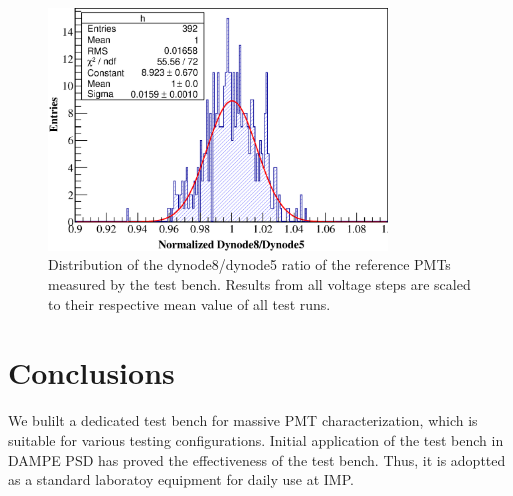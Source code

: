 \documentclass[5p, times]{elsarticle}
\begin{document}
\begin{figure}[h!]
 \centering
 \includegraphics[width=90mm]{RefDy58Dist}
\caption{Distribution of the dynode8/dynode5 ratio of the reference PMTs measured by the test bench.
Results from all voltage steps are scaled to their respective mean value of all test runs.}
\label{fig:dy58_stabiltiy}
\end{figure} 

\section{Conclusions}
\label{sec:conclustions}

We bulilt a dedicated test bench for massive PMT characterization, which is suitable for various testing configurations.
Initial application of the test bench in DAMPE PSD has proved the effectiveness of the test bench.
Thus, it is adoptted as a standard laboratoy equipment for daily use at IMP.
\end{document}
